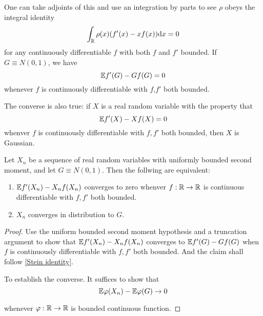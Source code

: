 One can take adjoints of this and use an integration by parts to see $\rho$ obeys the integral identity
\begin{equation*}
    \int_{\mathbb{R}}\rho (x)(f'(x)-xf(x))\mathrm{d} x=0
\end{equation*}
for any continuously differentiable $f$ with both $f$ and $f'$ bounded.
If $G\equiv N(0,1)$, we have 
\begin{equation}\label{Stein identity}
    \mathbb{E} f'(G)-Gf(G)=0
\end{equation}
whenever $f$ is continuously differentiable with $f$,$f'$ both bounded. 

The converse is also true: if $X$ is a real random variable with the property that 
\begin{equation*}
    \mathbb{E} f'(X)-Xf(X)=0
\end{equation*}
whenver $f$ is continuously differentiable with $f,f'$ both bounded, then $X$ is Gaussian. 

\begin{theorem}
    Let $X_n$ be a sequence of real random variables with uniformly bounded second moment, and let $G\equiv N(0,1)$. Then the follwing are equivalent:
    \begin{enumerate}
        \item $\mathbb{E} f'(X_n)-X_nf(X_n)$ converges to zero whenver $f:\mathbb{R} \to \mathbb{R} $ is continuous differentiable with $f,f'$ both bounded.
        \item $X_n$ converges in distribution to $G$.
    \end{enumerate}
\end{theorem}

\begin{proof}
    Use the uniform bounded second moment hypothesis and a truncation argument to show that $\mathbb{E} f'(X_n)-X_n f(X_n)$ converges to $\mathbb{E} f'(G)-Gf(G)$ when $f$ is continuously differentiable with $f,f'$ both bounded. And the claim shall follow \ref{Stein identity}. 

    To establish the converse. It suffices to show that 
    \begin{equation*}
        \mathbb{E} \varphi(X_n) -\mathbb{E} \varphi(G) \to 0
    \end{equation*}

    whenever $\varphi : \mathbb{R} \to \mathbb{R}$ is bounded continuous function.
\end{proof} 